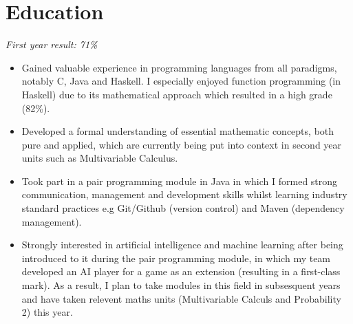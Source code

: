 \documentclass{cvclass}
\begin{document}
\titlespacing*{\subsection}{0pt}{\baselineskip}{1pt}
\address{Flat 7, 5-6 Clifton Down Road, Bristol, BS8 4AG}
\address{Email: sv17490@bristol.ac.uk, Mobile: 07908911995}
\address{Github: www.github.com/sollyvarcoe}
\section{Education}
\newline
\indent\indent\textit{First year result: 71\%}
\begin{itemize}
  \item Gained valuable experience in programming languages from all paradigms, notably C, Java and Haskell. I especially enjoyed function programming (in Haskell) due to its mathematical approach which resulted in a high grade (82\%).
  \item Developed a formal understanding of essential mathematic concepts, both pure and applied, which are currently being put into context in second year units such as Multivariable Calculus.
  \item Took part in a pair programming module in Java in which I formed strong communication, management and development skills whilst learning industry standard practices e.g Git/Github (version control) and Maven (dependency management).
  \item Strongly interested in artificial intelligence and machine learning after being introduced to it during the pair programming module, in which my team developed an AI player for a game as an extension (resulting in a first-class mark). As a result, I plan to take modules in this field in subsesquent years and have taken relevent maths units (Multivariable Calculs and Probability 2) this year.
\end{itemize}
\newline
{}\newline
{}
\end{document}

